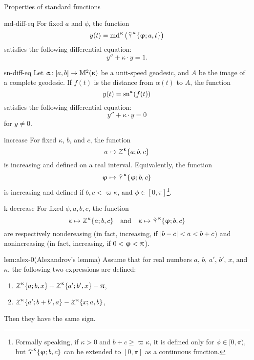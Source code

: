 \begin{thm}{Properties of standard functions}\label{md-equalities}

\begin{subthm}{md-diff-eq}
For fixed $a$ and $\phi$, the function 
\[y(t)=\mathrm{md}^{\upkappa}\left(\mathop{\tilde\curlyvee}\nolimits^{\upkappa}\{\upvarphi;a,t\}\right)\]
 satisfies the following differential equation:
\[y''+\kappa\cdot y=1.\]
\end{subthm}

\begin{subthm}{sn-diff-eq}
Let $\alpha\:[a,b]\to\Lob2\kappa$ be a unit-speed geodesic, and $A$ be the image of a complete geodesic.  If $f(t)$ is the distance from $\alpha(t)$ to $A$, the function 
\[y(t)=\mathrm{sn}^{\upkappa} (f(t))\]
 satisfies the following differential equation:
\[y''+\kappa\cdot y=0\]
for $y\ne 0$.
\end{subthm}

\begin{subthm}{increase}
For fixed $\kappa$, $b$, and $c$, the function 
\[a\mapsto\tangle\mc\kappa\{a;b,c\}\]
is increasing and defined on a real interval.
Equivalently, the function
\[\phi\mapsto\side\kappa \{\phi;b,c\}\]
is increasing and defined if $b,c<\varpi\kappa$, and $\phi\in[0,\pi]$\footnote{Formally speaking, if $\kappa>0$ and $b+c\ge \varpi\kappa$, it is defined only for $\phi\in[0,\pi)$, but $\mathop{\tilde\curlyvee}\nolimits^{\upkappa} \{\upvarphi;b,c\}$ can be extended to $[0,\pi]$ as a continuous function.}.
\end{subthm}

\begin{subthm}{k-decrease}
For fixed $\phi,a,b,c$, the function
\[\kappa\mapsto \tangle\mc\kappa\{a;b,c\}\quad \text{and}\quad \kappa\mapsto \side\kappa \{\phi;b,c\}\]
are respectively nondereasing (in fact, increasing, if $|b\z-c|\z<a\z< b+c$)
and nonincreasing (in fact, increasing, if $0\z<\phi\z<\pi$).
\end{subthm}

\begin{subthm}{lem:alex-0}(Alexandrov's lemma)
Assume that for real numbers $a$, $b$, $a'$, $b'$, $x$, and $\kappa$, the following two expressions are defined:
\begin{enumerate}
\item $\tangle\mc\kappa\{a;b,x\}+\tangle\mc\kappa\{a';b',x\}-\pi$,
\item $\tangle\mc\kappa\{a';b+b',a\}-\tangle\mc\kappa\{x;a,b\}$,
\end{enumerate}
Then they have the same sign.
\end{subthm}
\end{thm}


